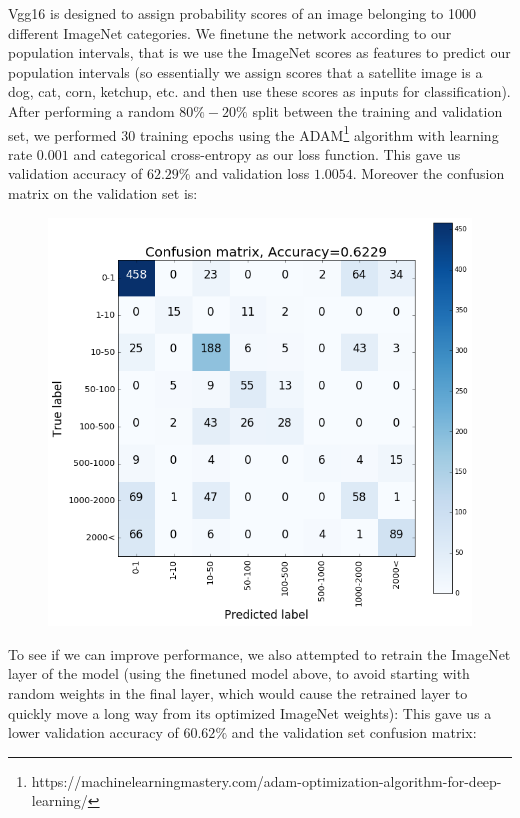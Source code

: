 \documentclass{article}
\begin{document}
Vgg16 is designed to assign probability scores of an image belonging to 1000 different ImageNet categories. We finetune the network according to our population intervals, that is we use the ImageNet scores as features to predict our population intervals (so essentially we assign scores that a satellite image is a dog, cat, corn, ketchup, etc. and then use these scores as inputs for classification). After performing a random $80\%-20\%$ split between the training and validation set, we performed 30 training epochs using the ADAM\footnote{https://machinelearningmastery.com/adam-optimization-algorithm-for-deep-learning/} algorithm with learning rate $0.001$ and categorical cross-entropy as our loss function. This gave us validation accuracy of $62.29\%$ and validation loss $1.0054$. Moreover the confusion matrix on the validation set is:
\begin{figure}[ht]
\centering
\includegraphics[scale=0.45]{conf_mx_Zsolt1.png}
\end{figure}

To see if we can improve performance, we also attempted to retrain the ImageNet layer of the model (using the finetuned model above, to avoid starting with random weights in the final layer, which would cause the retrained layer to quickly move a long way from its optimized ImageNet weights): This gave us  a lower validation accuracy of $60.62\%$ and the validation set confusion matrix:
\end{document}
